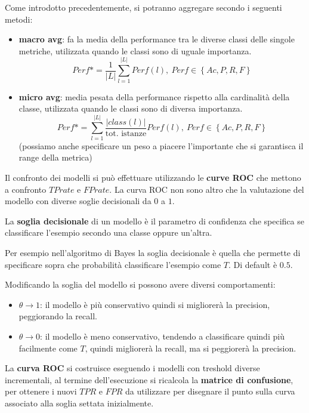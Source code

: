 Come introdotto precedentemente, si potranno aggregare secondo i seguenti metodi:
\begin{itemize}
    \item \textbf{macro avg}: fa la media della performance tra le diverse classi
          delle singole metriche, utilizzata quando le classi sono di uguale importanza.
          \begin{equation}
              Perf\ast = \frac{1}{|L|}\sum\limits_{l=1}^{|L|} Perf(l), \ Perf \in
              \left\{Ac, P, R, F\right\}
          \end{equation}
    \item \textbf{micro avg}: media pesata della performance rispetto alla cardinalità
          della classe, utilizzata quando le classi sono di diversa importanza.
          \begin{equation}
              Perf\ast = \sum\limits_{l=1}^{|L|} \frac{|class(l)|}{\text{tot.
                      istanze}}Perf(l), \ Perf \in \left\{Ac, P, R, F\right\}
          \end{equation}
          (possiamo anche specificare un peso a piacere l'importante che si
          garantisca il range della metrica)
\end{itemize}
Il confronto dei modelli si può effettuare utilizzando le \textbf{curve ROC} che
mettono a confronto $TP rate$ e $FP rate$. La curva ROC non sono altro che la
valutazione del modello con diverse soglie decisionali da $0$ a $1$.
\begin{definizione}
    La \textbf{soglia decisionale} di un modello è il parametro di confidenza
    che specifica se classificare l'esempio secondo una classe oppure un'altra.
\end{definizione}
\begin{esempio}
    Per esempio nell'algoritmo di Bayes la soglia decisionale è quella che permette
    di specificare sopra che probabilità classificare l'esempio come $T$. Di default
    è $0.5$.
\end{esempio}
Modificando la soglia del modello si possono avere diversi comportamenti:
\begin{itemize}
    \item $\theta \to 1$: il modello è più conservativo quindi si migliorerà la
          precision, peggiorando la recall.
    \item $\theta \to 0$: il modello è meno conservativo, tendendo a classificare
          quindi più facilmente come $T$, quindi migliorerà la
          recall, ma si peggiorerà la precision.
\end{itemize}
La \textbf{curva ROC} si costruisce eseguendo i modelli con treshold diverse
incrementali, al termine dell'esecuzione si ricalcola la \textbf{matrice di
    confusione}, per ottenere i nuovi $TPR$ e $FPR$ da utilizzare per disegnare
il punto sulla curva associato alla soglia settata inizialmente.

